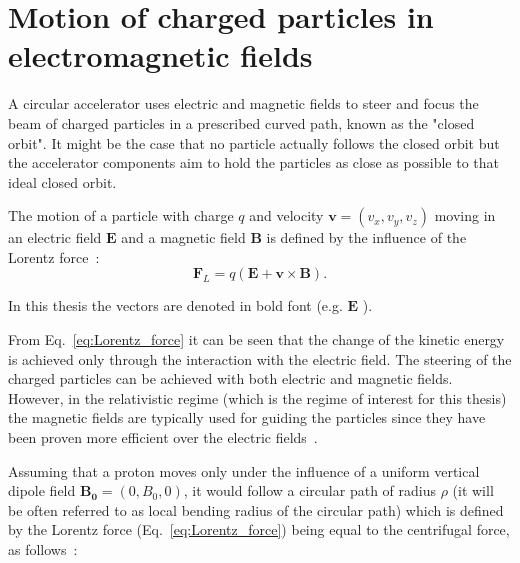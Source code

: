 \section{Motion of charged particles in electromagnetic fields}

A circular accelerator uses electric and magnetic fields to steer and focus the beam of charged particles in a prescribed curved path, known as the "closed orbit". %
It might be the case that no particle actually follows the closed orbit but the accelerator  components aim to hold the particles as close as possible to that ideal closed orbit. 


The motion of a particle with charge $q$ and velocity $\mathbf{v}=(v_x, v_y, v_z)$ moving in an electric field $\mathbf{E}$ and a magnetic field $\mathbf{B}$ is defined by the influence of the Lorentz force~\cite{Wiedemann:1083415}: 
\begin{equation}\label{eq:Lorentz_force}
 \mathbf{F}_L = q(\mathbf{E} + \mathbf{v} \times \mathbf{B}).
\end{equation}

In this thesis the vectors are denoted in bold font (e.g. $\mathbf{E}$ ). %

From Eq.~\eqref{eq:Lorentz_force} it can be seen that the change of the kinetic energy is achieved only through the interaction with the electric field. The steering of the charged particles can be achieved with both electric and magnetic fields. However, in the relativistic regime (which is the regime of interest for this thesis) the magnetic fields are typically used for guiding the particles since they have been proven more efficient over the electric fields~\cite{Wiedemann:1083415}.



Assuming that a proton moves only under the influence of a uniform vertical dipole field $\mathbf{B_0}=(0, B_0, 0)$, it would follow a circular path of radius $\rho$ (it will be often referred to as local bending radius of the circular path) which is defined by the Lorentz force (Eq.~\eqref{eq:Lorentz_force}) being equal to the centrifugal force, as follows~\cite{wolski2014}: %

